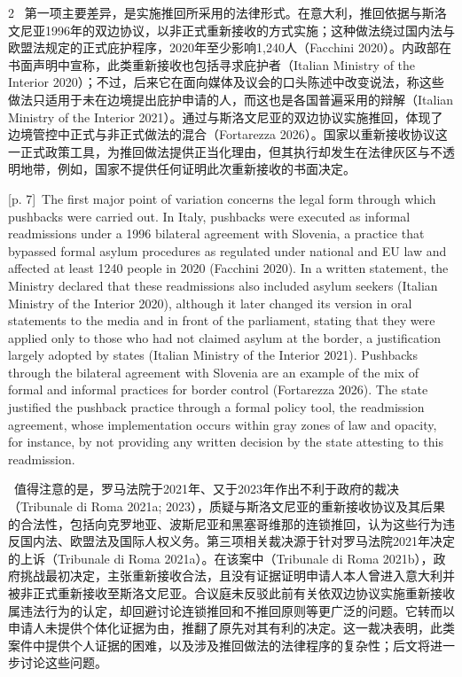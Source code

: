 \documentclass[10pt,a4paper]{article}
\begin{document}
\begin{paracol}{2}
\switchcolumn*
{\scriptsize\color{gray} [p. 7]}\ 第一项主要差异，是实施推回所采用的法律形式。在意大利，推回依据与斯洛文尼亚1996年的双边协议，以非正式重新接收的方式实施；这种做法绕过国内法与欧盟法规定的正式庇护程序，2020年至少影响1,240人（Facchini 2020）。内政部在书面声明中宣称，此类重新接收也包括寻求庇护者（Italian Ministry of the Interior 2020）；不过，后来它在面向媒体及议会的口头陈述中改变说法，称这些做法只适用于未在边境提出庇护申请的人，而这也是各国普遍采用的辩解（Italian Ministry of the Interior 2021）。通过与斯洛文尼亚的双边协议实施推回，体现了边境管控中正式与非正式做法的混合（Fortarezza 2026）。国家以重新接收协议这一正式政策工具，为推回做法提供正当化理由，但其执行却发生在法律灰区与不透明地带，例如，国家不提供任何证明此次重新接收的书面决定。\par
\switchcolumn
{\scriptsize\color{gray} [p. 7]}\ The first major point of variation concerns the legal form through which pushbacks were carried out. In Italy, pushbacks were executed as informal readmissions under a 1996 bilateral agreement with Slovenia, a practice that bypassed formal asylum procedures as regulated under national and EU law and affected at least 1240 people in 2020 (Facchini 2020). In a written statement, the Ministry declared that these readmissions also included asylum seekers (Italian Ministry of the Interior 2020), although it later changed its version in oral statements to the media and in front of the parliament, stating that they were applied only to those who had not claimed asylum at the border, a justification largely adopted by states (Italian Ministry of the Interior 2021). Pushbacks through the bilateral agreement with Slovenia are an example of the mix of formal and informal practices for border control (Fortarezza 2026). The state justified the pushback practice through a formal policy tool, the readmission agreement, whose implementation occurs within gray zones of law and opacity, for instance, by not providing any written decision by the state attesting to this readmission.\par
\switchcolumn*
{\scriptsize\color{gray} [p. 8]}\ 值得注意的是，罗马法院于2021年、又于2023年作出不利于政府的裁决（Tribunale di Roma 2021a; 2023），质疑与斯洛文尼亚的重新接收协议及其后果的合法性，包括向克罗地亚、波斯尼亚和黑塞哥维那的连锁推回，认为这些行为违反国内法、欧盟法及国际人权义务。第三项相关裁决源于针对罗马法院2021年决定的上诉（Tribunale di Roma 2021a）。在该案中（Tribunale di Roma 2021b），政府挑战最初决定，主张重新接收合法，且没有证据证明申请人本人曾进入意大利并被非正式重新接收至斯洛文尼亚。合议庭未反驳此前有关依双边协议实施重新接收属违法行为的认定，却回避讨论连锁推回和不推回原则等更广泛的问题。它转而以申请人未提供个体化证据为由，推翻了原先对其有利的决定。这一裁决表明，此类案件中提供个人证据的困难，以及涉及推回做法的法律程序的复杂性；后文将进一步讨论这些问题。\par

\end{paracol}
\end{document}
